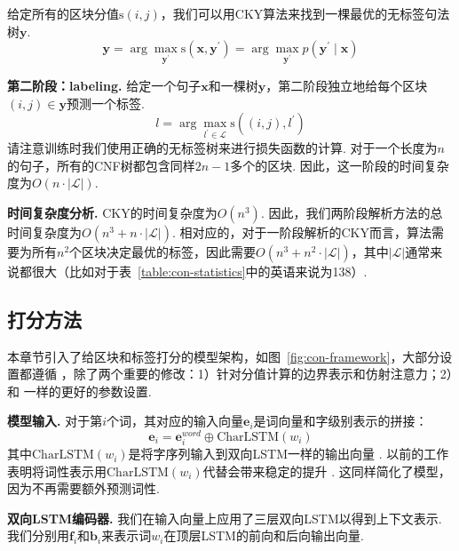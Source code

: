 给定所有的区块分值$\mathrm{s}(i,j)$，我们可以用CKY算法来找到一棵最优的无标签句法树$\boldsymbol{y}$.
\begin{equation} \label{eq:tree-argmax}
  \boldsymbol{y} = \arg\max_{\boldsymbol{y}^{\prime}} \mathrm{s}(\boldsymbol{x}, \boldsymbol{y}^{\prime}) = \arg\max_{\boldsymbol{y}^{\prime}} p(\boldsymbol{y}^{\prime} \mid \boldsymbol{x})
\end{equation}

\noindent\textbf{第二阶段：labeling.}
给定一个句子$\boldsymbol{x}$和一棵树$\boldsymbol{y}$，第二阶段独立地给每个区块$(i,j) \in \boldsymbol{y}$预测一个标签.
\begin{equation} \label{eq:label-argmax}
  l = \arg\max_{l^{\prime} \in \mathcal{L}} \mathrm{s}((i,j),l^{\prime})
\end{equation}
请注意训练时我们使用正确的无标签树来进行损失函数的计算.
对于一个长度为$n$的句子，所有的CNF树都包含同样$2n-1$多个的区块.
因此，这一阶段的时间复杂度为$O(n\cdot|\mathcal{L}|)$.

\noindent\textbf{时间复杂度分析.}
CKY的时间复杂度为$O(n^3)$.
因此，我们两阶段解析方法的总时间复杂度为$O(n^3+n\cdot|\mathcal{L}|)$.
相对应的，对于一阶段解析的CKY而言，算法需要为所有$n^2$个区块决定最优的标签，因此需要$O(n^3+n^2\cdot|\mathcal{L}|)$，其中$|\mathcal{L}|$通常来说都很大（比如对于表~\ref{table:con-statistics}中的英语来说为138）.

\subsection{打分方法}

本章节引入了给区块和标签打分的模型架构，如图~\ref{fig:con-framework}，大部分设置都遵循 \citet{stern-etal-2017-minimal}，除了两个重要的修改：1）针对分值计算的边界表示和仿射注意力；2）和 \citet{dozat-etal-2017-biaffine}一样的更好的参数设置.

\noindent\textbf{模型输入.}
对于第$i$个词，其对应的输入向量$\mathbf{e}_i$是词向量和字级别表示的拼接：
\begin{equation} \label{eq:token-representation}
  \mathbf{e}_i = \mathbf{e}^{word}_i \oplus \mathrm{CharLSTM}(w_i)
\end{equation}
其中$\mathrm{CharLSTM}(w_i)$是将字序列输入到双向LSTM一样的输出向量 \citep{lample-etal-2016-neural}.
以前的工作表明将词性表示用$\mathrm{CharLSTM}(w_i)$代替会带来稳定的提升 \citep{kitaev-klein-2018-constituency}.
这同样简化了模型，因为不再需要额外预测词性.

\noindent\textbf{双向LSTM编码器.}
我们在输入向量上应用了三层双向LSTM以得到上下文表示.
我们分别用$\mathbf{f}_i$和$\mathbf{b}_i$来表示词$w_i$在顶层LSTM的前向和后向输出向量.

